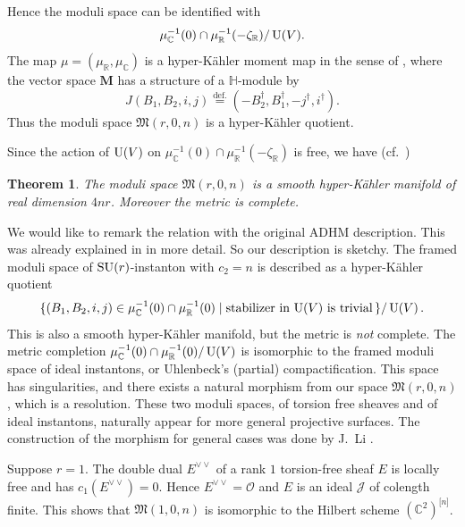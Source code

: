 \documentclass[12pt]{amsart}
\newcommand{\cal}{\mathcal}
\renewcommand{\frak}{\mathfrak}
\newtheorem{Theorem}[equation]{Theorem}
\theoremstyle{definition}
\theoremstyle{remark}
\numberwithin{equation}{section}
\newcommand{\defeq}{\overset{\operatorname{\scriptstyle def.}}{=}}
\newcommand{\C}{{\mathbb C}}
\newcommand{\R}{{\mathbb R}}
\newcommand{\SU}{\operatorname{\rm SU}}
\newcommand{\U}{\operatorname{\rm U}}
\newcommand{\Hilb}[2]{{#1}^{\lbrack{#2}\rbrack}} %
\newcommand{\Hilbn}[1]{\Hilb{#1}{n}}
\newcommand{\shfO}{\cal O} %
\newcommand{\bM}{{\mathbf M}} %
\newcommand{\M}{{\frak M}} %
\begin{document}
Hence the moduli space can be identified with
\begin{equation*}
  \mu_\C^{-1}(0)\cap\mu_\R^{-1}(-\zeta_\R) / \U(V).
\end{equation*}
The map $\mu = (\mu_\R, \mu_\C)$ is a hyper-K\"ahler moment map in the
sense of \cite{HKLR},
where the vector space $\bM$ has a structure of a $\mathbb H$-module by
\begin{equation*}
  J (B_1, B_2, i, j) \defeq
  (-B_2^\dagger, B_1^\dagger, -j^\dagger, i^\dagger).
\end{equation*}
Thus the moduli space $\M(r,0,n)$ is a hyper-K\"ahler quotient.

Since the action of $\U(V)$ on
$\mu_\C^{-1}(0)\cap\mu_\R^{-1}(-\zeta_\R)$ is free, we have
(cf.~\cite[1.3]{Na-resol})
\begin{Theorem}
  The moduli space $\M(r,0,n)$ is a smooth hyper-K\"ahler manifold of
  real dimension $4nr$. Moreover the metric is complete.
\end{Theorem}

We would like to remark the relation with the original ADHM
description. This was already explained in \cite{Na-resol} in more
detail. So our description is sketchy.
The framed moduli space of
$\SU(r)$-instanton with $c_2 = n$ is described as a hyper-K\"ahler
quotient
\begin{equation}
  \{ (B_1, B_2, i, j) \in \mu_\C^{-1}(0)\cap\mu_\R^{-1}(0) \mid
  \text{stabilizer in $\U(V)$ is trivial}\, \} / \U(V)\, .
\label{eq:instanton}\end{equation}
This is also a smooth hyper-K\"ahler manifold, but the metric is {\it
  not\/} complete. The metric completion
$\mu_\C^{-1}(0)\cap\mu_\R^{-1}(0)/\U(V)$ is isomorphic to the framed
moduli space of ideal instantons, or Uhlenbeck's (partial)
compactification. This space has singularities, and there exists a
natural morphism from our space $\M(r,0,n)$, which is a resolution.
These two moduli spaces, of torsion free sheaves and of ideal
instantons, naturally appear for more general projective surfaces. The
construction of the morphism for general cases was done by J.~Li
\cite{Li}.

Suppose $r = 1$. The double dual $E^{\vee\vee}$ of a rank
$1$ torsion-free sheaf $E$ is locally free and has
$c_1(E^{\vee\vee}) = 0$. Hence $E^{\vee\vee} = \shfO$ and $E$ is an
ideal $\cal J$ of colength finite. This shows that $\M(1,0,n)$ is
isomorphic to the Hilbert scheme $\Hilbn{(\C^2)}$.
\end{document}
